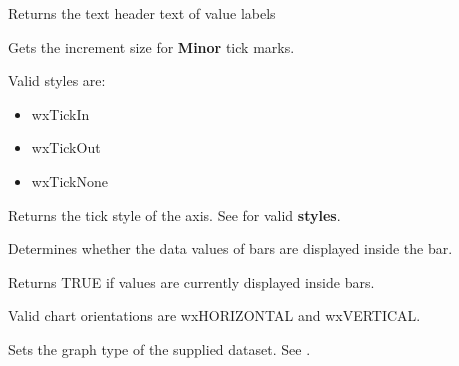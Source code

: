 
Returns the text header text of value labels

Gets the increment size for {\bf Minor} tick marks.

\label{settickstyle}

	
Valid styles are:

\begin{itemize}\itemsep=0pt
\item wxTickIn
\item wxTickOut
\item wxTickNone
\end{itemize}


\label{gettickstyle}

	
Returns the tick style of the axis. See  for valid {\bf styles}.

\label{showvalues}

	
Determines whether the data values of bars are displayed inside the bar.

\label{getshowvalues}

	
Returns TRUE if values are currently displayed inside bars.

\label{setorientation}

	
Valid chart orientations are wxHORIZONTAL and wxVERTICAL.

\label{setdatatype}


Sets the graph type of the supplied dataset.
See .

\label{setlinestyle}


